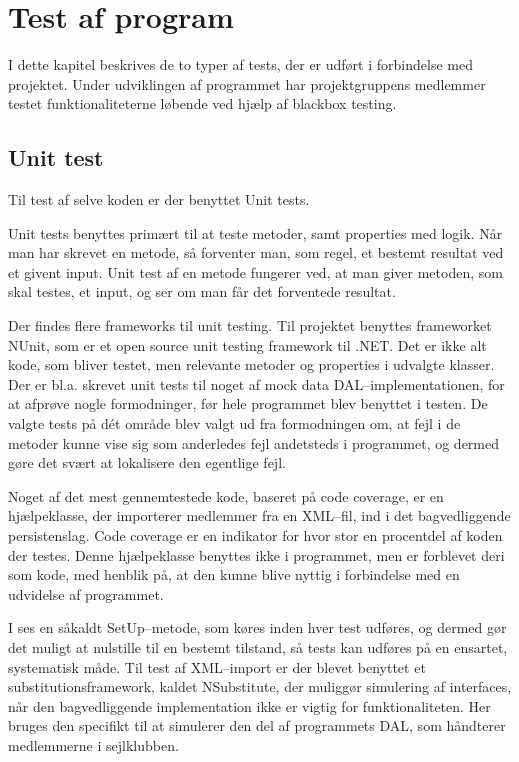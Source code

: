 \chapter{Test af program}\label{test_af_program}
I dette kapitel beskrives de to typer af tests, der er udført i forbindelse med projektet.
Under udviklingen af programmet har projektgruppens medlemmer testet funktionaliteterne løbende ved hjælp af blackbox testing.

\section{Unit test}
Til test af selve koden er der benyttet Unit tests.

Unit tests benyttes primært til at teste metoder, samt properties med logik.
Når man har skrevet en metode, så forventer man, som regel, et bestemt resultat ved et givent input.
Unit test af en metode fungerer ved, at man giver metoden, som skal testes, et input, og ser om man får det forventede resultat.

Der findes flere frameworks til unit testing.
Til projektet benyttes frameworket NUnit, som er et open source unit testing framework til .NET.
Det er ikke alt kode, som bliver testet, men relevante metoder og properties i udvalgte klasser.
Der er bl.a. skrevet unit tests til noget af mock data \ac{DAL}--implementationen, for at afprøve nogle formodninger, før hele programmet blev benyttet i testen.
De valgte tests på dét område blev valgt ud fra formodningen om, at fejl i de metoder kunne vise sig som anderledes fejl andetsteds i programmet, og dermed gøre det svært at lokalisere den egentlige fejl.

Noget af det mest gennemtestede kode, baseret på code coverage, er en hjælpeklasse, der importerer medlemmer fra en XML--fil, ind i det bagvedliggende persistenslag. 
Code coverage er en indikator for hvor stor en procentdel af koden der testes.
Denne hjælpeklasse benyttes ikke i programmet, men er forblevet deri som kode, med henblik på, at den kunne blive nyttig i forbindelse med en udvidelse af programmet.

I  ses en såkaldt SetUp--metode, som køres inden hver test udføres, og dermed gør det muligt at nulstille til en bestemt tilstand, så tests kan udføres på en ensartet, systematisk måde.
Til test af XML--import er der blevet benyttet et substitutionsframework, kaldet NSubstitute, der muliggør simulering af interfaces, når den bagvedliggende implementation ikke er vigtig for funktionaliteten.
Her bruges den specifikt til at simulerer den del af programmets \ac{DAL}, som håndterer medlemmerne i sejlklubben.

